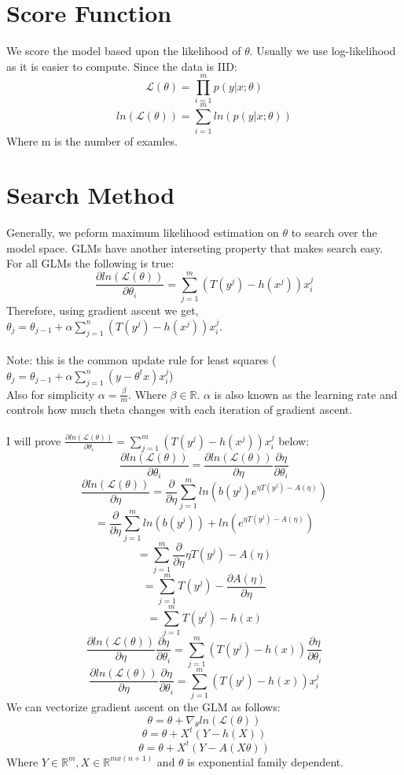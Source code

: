 \documentclass{article}
\newcommand{\fancyL}{\mathcal{L}}
\newcommand{\R}{\mathbb{R}}
\newcommand{\pard}[2]{\frac{\partial {#1}}{\partial {#2}}}
\begin{document}
\section{Score Function}

We score the model based upon the likelihood of $\theta$. Usually we use log-likelihood as it is easier to compute. 
Since the data is IID:\\

$$\fancyL(\theta) = \prod_{i=1}^{m} p(y|x;\theta)$$
$$ln(\fancyL(\theta)) = \sum_{i=1}^{m} ln(p(y|x;\theta))$$
Where m is the number of examles.

\section{Search Method}

Generally, we peform maximum likelihood estimation on $\theta$ to search over the model space. 
GLMs have another interseting property that makes search easy. For all GLMs the following is true:
$$\pard{ln(\fancyL(\theta))}{\theta_i} = \sum_{j=1}^{m} (T(y^j) - h(x^j))x^j_i$$
Therefore, using gradient ascent we get, $\theta_j = \theta_{j-1} + \alpha \sum_{j=1}^{n} (T(y^j) - h(x^j))x^j_i$.\\\\
Note: this is the common update rule for least squares  ($\theta_j = \theta_{j-1}  + \alpha \sum_{j=1}^{n} (y- \theta^t x)x^j_i$)\\
Also for simplicity $ \alpha = \frac{\beta}{m}$. Where $\beta \in \R$. $\alpha$ is also known as the learning rate and controls how much theta changes with 
each iteration of gradient ascent. 
\\\\
I will prove $\pard{ln(\fancyL(\theta))}{\theta_i} = \sum_{j=1}^{m} (T(y^j) - h(x^j))x^j_i$ below:
$$\pard{ln(\fancyL(\theta))}{\theta_i} = \pard{ln(\fancyL(\theta))}{\eta} \pard{\eta}{\theta_i}$$
$$\pard{ln(\fancyL(\theta))}{\eta}  =  \pard{}{\eta} \sum_{j=1}^{m} ln(b(y^j)e^{\eta T(y^j) - A(\eta)})$$
$$ = \pard{}{\eta} \sum_{j=1}^{m} ln(b(y^j)) + ln(e^{\eta T(y^j) - A(\eta)})$$
$$ =  \sum_{j=1}^{m} \pard{}{\eta} {\eta T(y^j) - A(\eta)}$$
$$ =  \sum_{j=1}^{m} {T(y^j) - \pard{A(\eta)}{\eta}}$$
$$ =  \sum_{j=1}^{m} {T(y^j) - h(x)}$$
$$\pard{ln(\fancyL(\theta))}{\eta} \pard{\eta}{\theta_i} = \sum_{j=1}^{m} ({T(y^j) - h(x)}) \pard{\eta}{\theta_i} $$
$$\pard{ln(\fancyL(\theta))}{\eta} \pard{\eta}{\theta_i} = \sum_{j=1}^{m} ({T(y^j) - h(x)}) x^j_i $$
We can vectorize gradient ascent on the GLM as follows:
$$\theta =  \theta + \nabla_{\theta} ln(\fancyL(\theta))$$
$$\theta =  \theta + X^t(Y-h(X))$$
$$\theta =  \theta + X^t(Y-A(X\theta))$$
Where $Y \in \R^{m}, X \in \R^{m x (n+1)}$ and $\theta$ is exponential family dependent. 
\end{document}
